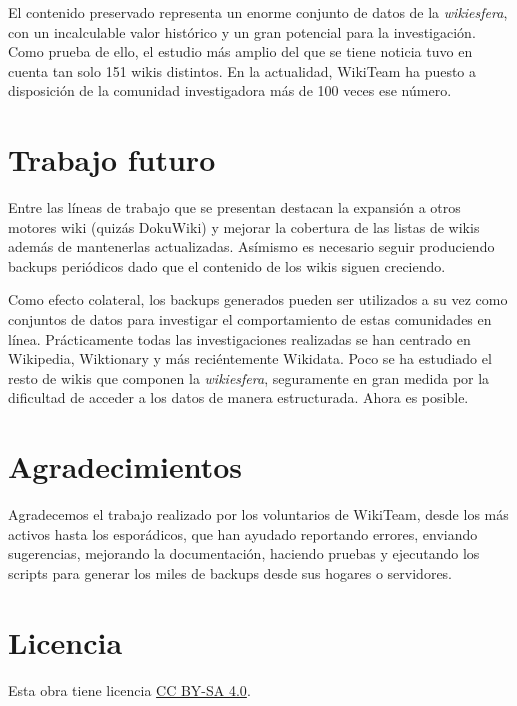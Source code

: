 \documentclass[14pt,twocolumn]{article}
\begin{document}
El contenido preservado representa un enorme conjunto de datos de la \textit{wikiesfera}, con un incalculable valor histórico y un gran potencial para la investigación. Como prueba de ello, el estudio más amplio del que se tiene noticia tuvo en cuenta tan solo 151 wikis distintos.\cite{stuckman2009} En la actualidad, WikiTeam ha puesto a disposición de la comunidad investigadora más de 100 veces ese número.

\section{Trabajo futuro}

Entre las líneas de trabajo que se presentan destacan la expansión a otros motores wiki (quizás DokuWiki) y mejorar la cobertura de las listas de wikis además de mantenerlas actualizadas. Asímismo es necesario seguir produciendo backups periódicos dado que el contenido de los wikis siguen creciendo.

Como efecto colateral, los backups generados pueden ser utilizados a su vez como conjuntos de datos para investigar el comportamiento de estas comunidades en línea. Prácticamente todas las investigaciones realizadas se han centrado en Wikipedia, Wiktionary y más reciéntemente Wikidata. Poco se ha estudiado el resto de wikis que componen la \textit{wikiesfera}, seguramente en gran medida por la dificultad de acceder a los datos de manera estructurada. Ahora es posible.

\section*{Agradecimientos}

Agradecemos el trabajo realizado por los voluntarios de WikiTeam, desde los más activos hasta los esporádicos, que han ayudado reportando errores, enviando sugerencias, mejorando la documentación, haciendo pruebas y ejecutando los scripts para generar los miles de backups desde sus hogares o servidores.

\section*{Licencia}
Esta obra tiene licencia \href{http://creativecommons.org/licenses/by-sa/4.0/}{CC BY-SA 4.0}.



\end{document}
